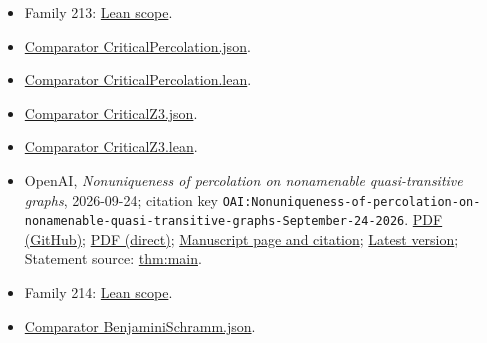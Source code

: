 \documentclass[11pt]{article}
\begin{document}
\begin{itemize}
\item Family 213: \href{https://github.com/openai/math/blob/adc7f1241b42e322a6451854ab7e4b4c146bf78a/lean/docs/213.md}{Lean scope}.
\item \href{https://github.com/openai/math/blob/adc7f1241b42e322a6451854ab7e4b4c146bf78a/lean/ComparatorChallenges/CriticalPercolation.json}{Comparator CriticalPercolation.json}.
\item \href{https://github.com/openai/math/blob/adc7f1241b42e322a6451854ab7e4b4c146bf78a/lean/ComparatorChallenges/CriticalPercolation.lean}{Comparator CriticalPercolation.lean}.
\item \href{https://github.com/openai/math/blob/adc7f1241b42e322a6451854ab7e4b4c146bf78a/lean/ComparatorChallenges/CriticalZ3.json}{Comparator CriticalZ3.json}.
\item \href{https://github.com/openai/math/blob/adc7f1241b42e322a6451854ab7e4b4c146bf78a/lean/ComparatorChallenges/CriticalZ3.lean}{Comparator CriticalZ3.lean}.
\item OpenAI, \emph{Nonuniqueness of percolation on nonamenable quasi-transitive graphs}, 2026-09-24; citation key \texttt{OAI:Nonuniqueness-of-percolation-on-nonamenable-quasi-transitive-graphs-September-24-2026}. \href{https://github.com/openai/math/blob/adc7f1241b42e322a6451854ab7e4b4c146bf78a/preprints/Nonuniqueness-of-percolation-on-nonamenable-quasi-transitive-graphs-September-24-2026/paper.pdf}{PDF (GitHub)}; \href{https://github.com/openai/math/raw/adc7f1241b42e322a6451854ab7e4b4c146bf78a/preprints/Nonuniqueness-of-percolation-on-nonamenable-quasi-transitive-graphs-September-24-2026/paper.pdf}{PDF (direct)}; \href{https://github.com/openai/math/blob/adc7f1241b42e322a6451854ab7e4b4c146bf78a/preprints/Nonuniqueness-of-percolation-on-nonamenable-quasi-transitive-graphs-September-24-2026/README.md}{Manuscript page and citation}; \href{https://github.com/openai/math/blob/main/preprints/Nonuniqueness-of-percolation-on-nonamenable-quasi-transitive-graphs-September-24-2026/paper.pdf}{Latest version}; Statement source: \href{https://github.com/openai/math/blob/adc7f1241b42e322a6451854ab7e4b4c146bf78a/preprints/Nonuniqueness-of-percolation-on-nonamenable-quasi-transitive-graphs-September-24-2026/build/sections/introduction.tex\#L58}{thm:main}.
\item Family 214: \href{https://github.com/openai/math/blob/adc7f1241b42e322a6451854ab7e4b4c146bf78a/lean/docs/214.md}{Lean scope}.
\item \href{https://github.com/openai/math/blob/adc7f1241b42e322a6451854ab7e4b4c146bf78a/lean/ComparatorChallenges/BenjaminiSchramm.json}{Comparator BenjaminiSchramm.json}.

\end{itemize}
\end{document}

